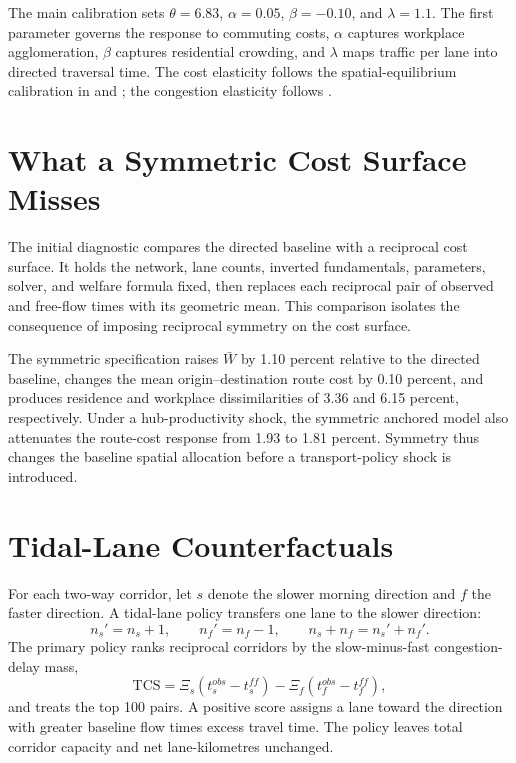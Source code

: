 \documentclass[12pt]{article}
\begin{document}
The main calibration sets $\theta=6.83$, $\alpha=0.05$, $\beta=-0.10$, and $\lambda=1.1$. The first parameter governs the response to commuting costs, $\alpha$ captures workplace agglomeration, $\beta$ captures residential crowding, and $\lambda$ maps traffic per lane into directed traversal time. The cost elasticity follows the spatial-equilibrium calibration in \citet{ahlfeldt2015} and \citet{allenarkolakis2022}; the congestion elasticity follows \citet{barwick2024}.

\section{What a Symmetric Cost Surface Misses}

The initial diagnostic compares the directed baseline with a reciprocal cost surface. It holds the network, lane counts, inverted fundamentals, parameters, solver, and welfare formula fixed, then replaces each reciprocal pair of observed and free-flow times with its geometric mean. This comparison isolates the consequence of imposing reciprocal symmetry on the cost surface.

The symmetric specification raises $\bar W$ by 1.10 percent relative to the directed baseline, changes the mean origin--destination route cost by 0.10 percent, and produces residence and workplace dissimilarities of 3.36 and 6.15 percent, respectively. Under a hub-productivity shock, the symmetric anchored model also attenuates the route-cost response from 1.93 to 1.81 percent. Symmetry thus changes the baseline spatial allocation before a transport-policy shock is introduced.

\section{Tidal-Lane Counterfactuals}

For each two-way corridor, let $s$ denote the slower morning direction and $f$ the faster direction. A tidal-lane policy transfers one lane to the slower direction:
\begin{equation}
  n_s'=n_s+1,
  \qquad
  n_f'=n_f-1,
  \qquad
  n_s+n_f=n_s'+n_f'.
  \label{eq:tidal}
\end{equation}
The primary policy ranks reciprocal corridors by the slow-minus-fast congestion-delay mass,
\begin{equation}
  \mathrm{TCS}=
  \Xi_s(t_s^{obs}-t_s^{ff})-
  \Xi_f(t_f^{obs}-t_f^{ff}),
  \label{eq:tcs}
\end{equation}
and treats the top 100 pairs. A positive score assigns a lane toward the direction with greater baseline flow times excess travel time. The policy leaves total corridor capacity and net lane-kilometres unchanged.
\end{document}
